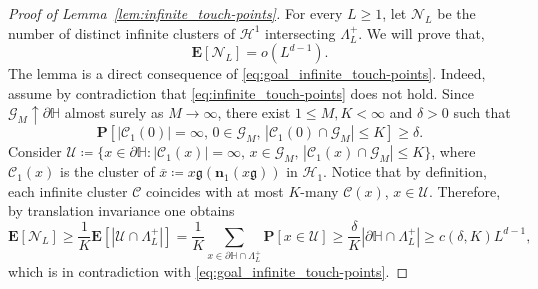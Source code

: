 \documentclass[11pt,a4paper]{article}
\theoremstyle{definition}
\numberwithin{equation}{section}
\newcommand\n{\mathbf{n}}
\newcommand\fg{\mathfrak{g}}
\begin{document}
\begin{proof}[Proof of Lemma~\textup{\ref{lem:infinite_touch-points}}]
For every $L\geq 1$, let $\mathcal{N}_L$ be the number of distinct infinite clusters of $\mathcal{H}^1$ intersecting $\Lambda^+_L$. We will prove that, 
\begin{equation}\label{eq:goal_infinite_touch-points}
    \mathbf{E}[\mathcal{N}_L]=o(L^{d-1}).
\end{equation}
The lemma is a direct consequence of \eqref{eq:goal_infinite_touch-points}. Indeed, assume by contradiction that \eqref{eq:infinite_touch-points} does not hold. Since $\mathcal{G}_M\uparrow\partial \mathbb{H}$ almost surely as $M\to \infty$, there exist $1\leq M,K<\infty$ and $\delta>0$ such that 
\begin{equation}
\mathbf{P}[|\mathcal{C}_1(0)|=\infty,\, 0\in \mathcal{G}_M,\, |\mathcal{C}_1(0)\cap\mathcal{G}_M|\leq K]\geq \delta.
\end{equation}
Consider $\mathcal{U}\coloneqq \{x\in \partial\mathbb{H}:|\mathcal{C}_1(x)|=\infty,\, x\in \mathcal{G}_M,\, |\mathcal{C}_1(x)\cap\mathcal{G}_M|\leq K\}$, where $\mathcal{C}_1(x)$ is the cluster of $\overline{x}\coloneqq x\fg(\n_1(x\fg))$ in $\mathcal{H}_1$. Notice that by definition, each infinite cluster $\mathcal{C}$ coincides with at most $K$-many $\mathcal{C}(x)$, $x\in \mathcal{U}$. Therefore, by translation invariance one obtains
\begin{equation}
\mathbf{E}[\mathcal{N}_L]\geq \frac{1}{K}\mathbf{E}[|\mathcal{U}\cap \Lambda^+_L|]=\frac{1}{K}\sum_{x\in \partial\mathbb{H}\cap\Lambda^+_L} \mathbf{P}[x\in \mathcal{U}]
\geq \frac{\delta}{K}|\partial\mathbb{H}\cap\Lambda^+_L|\geq c(\delta,K)L^{d-1},
\end{equation}
which is in contradiction with \eqref{eq:goal_infinite_touch-points}.


\end{proof}
\end{document}
